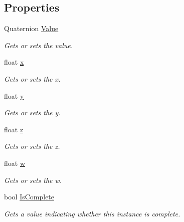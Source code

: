 \subsection*{Properties}
\begin{DoxyCompactItemize}
\item 
Quaternion \hyperlink{class_radical_library_1_1_smooth_quaternion_a9d3f043e67591ab5f423382e4c80e31a}{Value}
\begin{DoxyCompactList}\small\item\em Gets or sets the value. \end{DoxyCompactList}\item 
float \hyperlink{class_radical_library_1_1_smooth_quaternion_a2a7bf0affc8ae6e1bdb86503f14ca72b}{x}
\begin{DoxyCompactList}\small\item\em Gets or sets the x. \end{DoxyCompactList}\item 
float \hyperlink{class_radical_library_1_1_smooth_quaternion_a49802831b6ea1c84dcefe13469c5bac7}{y}
\begin{DoxyCompactList}\small\item\em Gets or sets the y. \end{DoxyCompactList}\item 
float \hyperlink{class_radical_library_1_1_smooth_quaternion_ae2dabfebd2cf2b1bcc8050a004348185}{z}
\begin{DoxyCompactList}\small\item\em Gets or sets the z. \end{DoxyCompactList}\item 
float \hyperlink{class_radical_library_1_1_smooth_quaternion_a3dc8ea0b5f162ce848b87677e3795433}{w}
\begin{DoxyCompactList}\small\item\em Gets or sets the w. \end{DoxyCompactList}\item 
bool \hyperlink{class_radical_library_1_1_smooth_quaternion_a9cfbac21089a16c9668e3ff0092b0adf}{Is\+Complete}
\begin{DoxyCompactList}\small\item\em Gets a value indicating whether this instance is complete. \end{DoxyCompactList}\end{DoxyCompactItemize}


